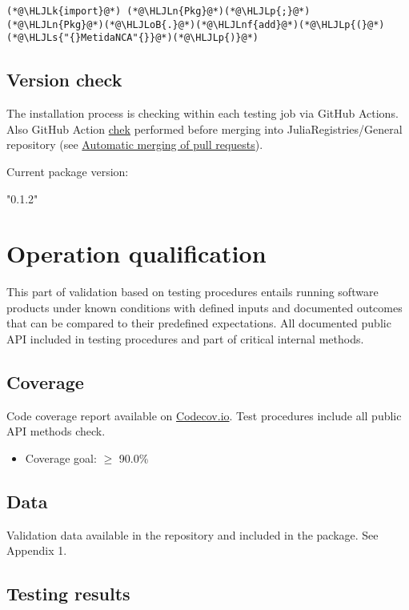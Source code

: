 \documentclass[12pt,a4paper]{article}
\newcommand{\HLJLk}[1]{\textcolor[RGB]{148,91,176}{\textbf{#1}}}
\newcommand{\HLJLn}[1]{#1}
\newcommand{\HLJLnf}[1]{\textcolor[RGB]{66,102,213}{#1}}
\newcommand{\HLJLs}[1]{\textcolor[RGB]{201,61,57}{#1}}
\newcommand{\HLJLoB}[1]{\textcolor[RGB]{102,102,102}{\textbf{#1}}}
\newcommand{\HLJLp}[1]{#1}
\begin{document}
\begin{lstlisting}
(*@\HLJLk{import}@*) (*@\HLJLn{Pkg}@*)(*@\HLJLp{;}@*) (*@\HLJLn{Pkg}@*)(*@\HLJLoB{.}@*)(*@\HLJLnf{add}@*)(*@\HLJLp{(}@*)(*@\HLJLs{"{}MetidaNCA"{}}@*)(*@\HLJLp{)}@*)
\end{lstlisting}

\subsection{Version check}
The installation process is checking within each testing job via GitHub Actions. Also GitHub Action \href{https://github.com/JuliaRegistries/General/blob/master/.github/workflows/automerge.yml}{chek} performed before merging into JuliaRegistries/General repository (see \href{https://github.com/JuliaRegistries/General#automatic-merging-of-pull-requests}{Automatic merging of pull requests}).



Current package version:


"0.1.2"


\section{Operation qualification}
This part of validation based on testing procedures entails running software products under known conditions with defined inputs and documented outcomes that can be compared to their predefined expectations. All documented public API included in testing procedures and part of critical internal methods.

\subsection{Coverage}
Code coverage report available on \href{https://app.codecov.io/gh/PharmCat/MetidaNCA.jl}{Codecov.io}. Test procedures include all  public API methods check.

\begin{itemize}
\item Coverage goal: \ensuremath{\geq} 90.0\%

\end{itemize}
\subsection{Data}
Validation data available in the repository and included in the package. See Appendix 1.

\subsection{Testing results}
\end{document}
